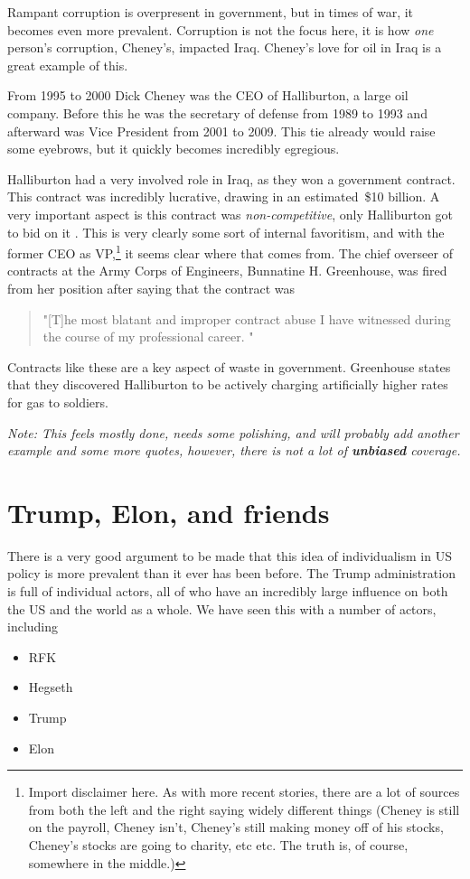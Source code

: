 \documentclass{article}
\begin{document}
        Rampant corruption is overpresent in government, but in times of war, it becomes even more prevalent. Corruption is not the focus here, it is how \textit{one} person's corruption, Cheney's, impacted Iraq. Cheney's love for oil in Iraq is a great example of this.

        From 1995 to 2000 Dick Cheney was the CEO of Halliburton, a large oil company. Before this he was the secretary of defense from 1989 to 1993 and afterward was Vice President from 2001 to 2009. This tie already would raise some eyebrows, but it quickly becomes incredibly egregious. 
        
        Halliburton had a very involved role in Iraq, as they won a government contract. This contract was incredibly lucrative, drawing in an estimated~\$10 billion. A very important aspect is this contract was \textit{non-competitive}, only Halliburton got to bid on it \parencite{bbc2008iraqcontracts}. This is very clearly some sort of internal favoritism, and with the former CEO as VP,\footnote{Import disclaimer here. As with more recent stories, there are a lot of sources from both the left and the right saying widely different things (Cheney is still on the payroll, Cheney 
        isn't, Cheney's still making money off of his stocks, Cheney's stocks are going to charity, etc etc. The truth is, of course, somewhere in the middle.)}
        it seems clear where that comes from. The chief overseer of contracts at the Army Corps of Engineers, Bunnatine H. Greenhouse, was fired from her position after saying that the contract was 
        \begin{quote}
            "[T]he most blatant and improper contract abuse I have witnessed during the course of my professional career. \parencite{nytimes2005halliburtoncontract}"
        \end{quote}  
        Contracts like these are a key aspect of waste in government. Greenhouse states that they discovered Halliburton to be actively charging artificially higher rates for gas to soldiers. \parencite{nytimes2005halliburtoncontract}

        \textit{Note: This feels mostly done, needs some polishing, and will probably add another example and some more quotes, however, there is not a lot of \textbf{unbiased} coverage. }
        
        

\section{Trump, Elon, and friends}
    There is a very good argument to be made that this idea of individualism in US policy is more prevalent than it ever has been before. The Trump administration is full of individual actors, all of who have an incredibly large influence on both the US and the world as a whole. We have seen this with a number of actors, including 
    \begin{itemize}
        \item RFK
        \item Hegseth 
        \item Trump
        \item Elon
    \end{itemize}
\end{document}
